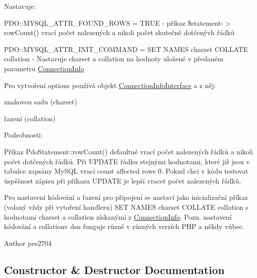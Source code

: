 Nastavuje\+:


\begin{DoxyItemize}
\item P\+D\+O\+::\+M\+Y\+S\+Q\+L\+\_\+\+A\+T\+T\+R\+\_\+\+F\+O\+U\+N\+D\+\_\+\+R\+O\+WS = T\+R\+UE -\/ příkaz \$statement-\/$>$row\+Count() vrací počet nalezených a nikoli počet skutečně dotčenývh řádků 
\item P\+D\+O\+::\+M\+Y\+S\+Q\+L\+\_\+\+A\+T\+T\+R\+\_\+\+I\+N\+I\+T\+\_\+\+C\+O\+M\+M\+A\+ND = S\+ET N\+A\+M\+ES charset C\+O\+L\+L\+A\+TE collation -\/ Nastavuje charset a collation na hodnoty uložené v předaném parametru \mbox{\hyperlink{class_pes_1_1_database_1_1_handler_1_1_connection_info}{Connection\+Info}}
\end{DoxyItemize}

Pro vytvoření options používá objekt \mbox{\hyperlink{interface_pes_1_1_database_1_1_handler_1_1_connection_info_interface}{Connection\+Info\+Interface}} a z něj\+: 
\begin{DoxyItemize}
\item znakovou sadu (charset) 
\item řazení (collation)
\end{DoxyItemize}

Podrobnosti\+:

Příkaz Pdo\+Statement\+::row\+Count() defaultně vrací počet nalezených řádků a nikoli počet dotčených řádků. Při U\+P\+D\+A\+TE řádku stejnými hodnotami, které již jsou v tabulce zapsány My\+S\+QL vrací count affected rows 0. Pokud chci v kódu testovat úspěšnost zápisu při příkazu U\+P\+D\+A\+TE je lepší vracet počet nalezených řádků.

Pro nastavení kódování a řazení pro připojení se nastaví jako inicializační příkaz (volaný vždy při vytoření handleru) S\+ET N\+A\+M\+ES charset C\+O\+L\+L\+A\+TE collation s hodnotami charset a collation získanými z \mbox{\hyperlink{class_pes_1_1_database_1_1_handler_1_1_connection_info}{Connection\+Info}}. Pozn. nastavení kódování a collationv dsn funguje různě v různých verzích P\+HP a někdy vůbec.

\begin{DoxyAuthor}{Author}
pes2704 
\end{DoxyAuthor}


\subsection{Constructor \& Destructor Documentation}
\mbox{\label{class_pes_1_1_database_1_1_handler_1_1_options_provider_1_1_options_provider_abstract_a4d086b03f47931c183f0414bf2da5103}} 
